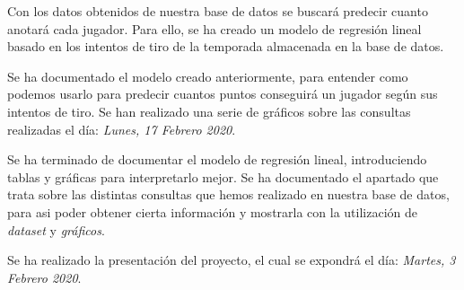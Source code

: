 \documentclass[idxtotoc,hyperref,openany]{labbook} %
\begin{document}
Con los datos obtenidos de nuestra base de datos se buscará predecir cuanto anotará cada jugador. Para ello, se ha creado un modelo de regresión lineal basado en los intentos de tiro de la temporada almacenada en la base de datos.

Se ha documentado el modelo creado anteriormente, para entender como podemos usarlo para predecir cuantos puntos conseguirá un jugador según sus intentos de tiro.
Se han realizado una serie de gráficos sobre las consultas realizadas el día: \textit{Lunes, 17 Febrero 2020}.

Se ha terminado de documentar el modelo de regresión lineal, introduciendo tablas y gráficas para interpretarlo mejor.
Se ha documentado el apartado que trata sobre las distintas consultas que hemos realizado en nuestra base de datos, para asi poder obtener cierta información y mostrarla con la utilización de \textit{dataset} y \textit{gráficos}.

Se ha realizado la presentación del proyecto, el cual se expondrá el día: \textit{Martes, 3 Febrero 2020}.

\end{document}
